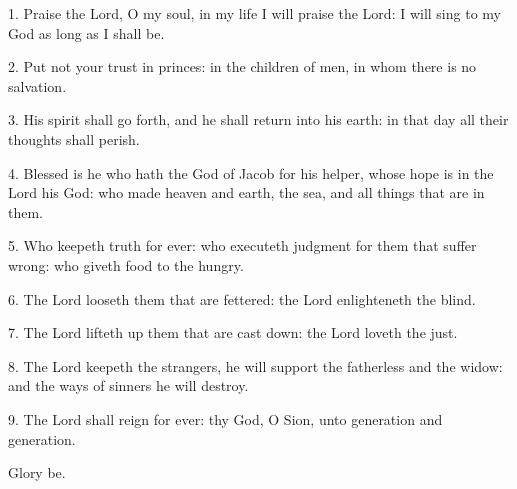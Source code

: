 1. Praise the Lord, O my soul, in my life I will praise the Lord: I will sing to my God as long as I shall be.

2. Put not your trust in princes: in the children of men, in whom there is no salvation.

3. His spirit shall go forth, and he shall return into his earth: in that day all their thoughts shall perish.

4. Blessed is he who hath the God of Jacob for his helper, whose hope is in the Lord his God: who made heaven and earth, the sea, and all things that are in them.

5. Who keepeth truth for ever: who executeth judgment for them that suffer wrong: who giveth food to the hungry.

6. The Lord looseth them that are fettered: the Lord enlighteneth the blind.

7. The Lord lifteth up them that are cast down: the Lord loveth the just.

8. The Lord keepeth the strangers, he will support the fatherless and the widow: and the ways of sinners he will destroy.

9. The Lord shall reign for ever: thy God, O Sion, unto generation and generation. 

Glory be.